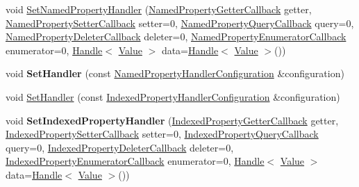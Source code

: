 \begin{DoxyCompactItemize}
\item 
void \hyperlink{classv8_1_1_object_template_ac7bcbb6e2936ab38490680f7e1bfb787}{Set\+Named\+Property\+Handler} (\hyperlink{namespacev8_a50cae386a68bf9ff23d02aa1161face4}{Named\+Property\+Getter\+Callback} getter, \hyperlink{namespacev8_a9587769513971dc7cb301b740d9e66b6}{Named\+Property\+Setter\+Callback} setter=0, \hyperlink{namespacev8_ac135beae5f0c8b290255accb438f990e}{Named\+Property\+Query\+Callback} query=0, \hyperlink{namespacev8_aaba861076c5b111912cfa0791d348437}{Named\+Property\+Deleter\+Callback} deleter=0, \hyperlink{namespacev8_a5f6f16818a9cddacadbfe6d90ca3a6b1}{Named\+Property\+Enumerator\+Callback} enumerator=0, \hyperlink{classv8_1_1_handle}{Handle}$<$ \hyperlink{classv8_1_1_value}{Value} $>$ data=\hyperlink{classv8_1_1_handle}{Handle}$<$ \hyperlink{classv8_1_1_value}{Value} $>$())
\item 
\hypertarget{classv8_1_1_object_template_a3d5666f1e9b0f46df6b4dbb7cfbb6114}{}void {\bfseries Set\+Handler} (const \hyperlink{structv8_1_1_named_property_handler_configuration}{Named\+Property\+Handler\+Configuration} \&configuration)\label{classv8_1_1_object_template_a3d5666f1e9b0f46df6b4dbb7cfbb6114}

\item 
void \hyperlink{classv8_1_1_object_template_abc92c2889776a5a1ef6831f9c3da3783}{Set\+Handler} (const \hyperlink{structv8_1_1_indexed_property_handler_configuration}{Indexed\+Property\+Handler\+Configuration} \&configuration)
\item 
\hypertarget{classv8_1_1_object_template_a5542f9cf400563a8c2fda448144feee1}{}void {\bfseries Set\+Indexed\+Property\+Handler} (\hyperlink{namespacev8_a48e7816ba64447bf32a25d194588daaf}{Indexed\+Property\+Getter\+Callback} getter, \hyperlink{namespacev8_a4ac7cc6185ebc8b6a199f9fa8e6bf5c3}{Indexed\+Property\+Setter\+Callback} setter=0, \hyperlink{namespacev8_a980b62c33eb664783e61e25c3b27f9ee}{Indexed\+Property\+Query\+Callback} query=0, \hyperlink{namespacev8_a53863728de14cde48dd6543207b2f2da}{Indexed\+Property\+Deleter\+Callback} deleter=0, \hyperlink{namespacev8_adbb0a6d5537371953f9ba807d4f6275e}{Indexed\+Property\+Enumerator\+Callback} enumerator=0, \hyperlink{classv8_1_1_handle}{Handle}$<$ \hyperlink{classv8_1_1_value}{Value} $>$ data=\hyperlink{classv8_1_1_handle}{Handle}$<$ \hyperlink{classv8_1_1_value}{Value} $>$())\label{classv8_1_1_object_template_a5542f9cf400563a8c2fda448144feee1}


\end{DoxyCompactItemize}

